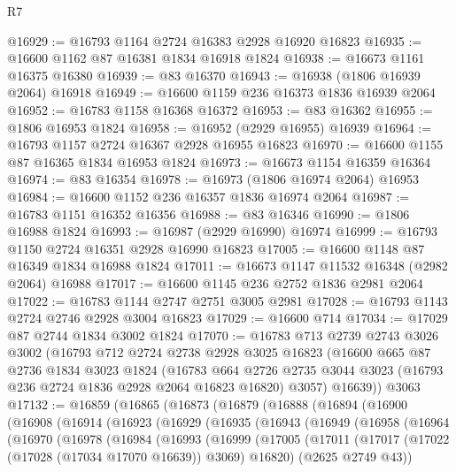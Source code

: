 \begin{lexlean}{R7}
\begin{coremodule}
@16929 := @16793 @1164 @2724 @16383 @2928 @16920 @16823
@16935 := @16600 @1162 @87 @16381 @1834 @16918 @1824
@16938 := @16673 @1161 @16375 @16380
@16939 := @83 @16370
@16943 := @16938 (@1806 @16939 @2064) @16918
@16949 := @16600 @1159 @236 @16373 @1836 @16939 @2064
@16952 := @16783 @1158 @16368 @16372
@16953 := @83 @16362
@16955 := @1806 @16953 @1824
@16958 := @16952 (@2929 @16955) @16939
@16964 := @16793 @1157 @2724 @16367 @2928 @16955 @16823
@16970 := @16600 @1155 @87 @16365 @1834 @16953 @1824
@16973 := @16673 @1154 @16359 @16364
@16974 := @83 @16354
@16978 := @16973 (@1806 @16974 @2064) @16953
@16984 := @16600 @1152 @236 @16357 @1836 @16974 @2064
@16987 := @16783 @1151 @16352 @16356
@16988 := @83 @16346
@16990 := @1806 @16988 @1824
@16993 := @16987 (@2929 @16990) @16974
@16999 := @16793 @1150 @2724 @16351 @2928 @16990 @16823
@17005 := @16600 @1148 @87 @16349 @1834 @16988 @1824
@17011 := @16673 @1147 @11532 @16348 (@2982 @2064) @16988
@17017 := @16600 @1145 @236 @2752 @1836 @2981 @2064
@17022 := @16783 @1144 @2747 @2751 @3005 @2981
@17028 := @16793 @1143 @2724 @2746 @2928 @3004 @16823
@17029 := @16600 @714
@17034 := @17029 @87 @2744 @1834 @3002 @1824
@17070 := @16783
    @713
    @2739
    @2743
    @3026
    @3002
    (@16793
      @712
      @2724
      @2738
      @2928
      @3025
      @16823
      (@16600
        @665
        @87
        @2736
        @1834
        @3023
        @1824
        (@16783
          @664
          @2726
          @2735
          @3044
          @3023
          (@16793 @236 @2724 @1836 @2928 @2064 @16823 @16820)
          @3057)
        @16639))
    @3063
@17132 := @16859
    (@16865
      (@16873
        (@16879
          (@16888
            (@16894
              (@16900
                (@16908
                  (@16914
                    (@16923
                      (@16929
                        (@16935
                          (@16943
                            (@16949
                              (@16958
                                (@16964
                                  (@16970
                                    (@16978
                                      (@16984
                                        (@16993
                                          (@16999
                                            (@17005
                                              (@17011
                                                (@17017
                                                  (@17022 (@17028 (@17034 @17070 @16639)) @3069)
                                                  @16820)
                                                (@2625 @2749 @43))

\end{coremodule}
\end{lexlean}
